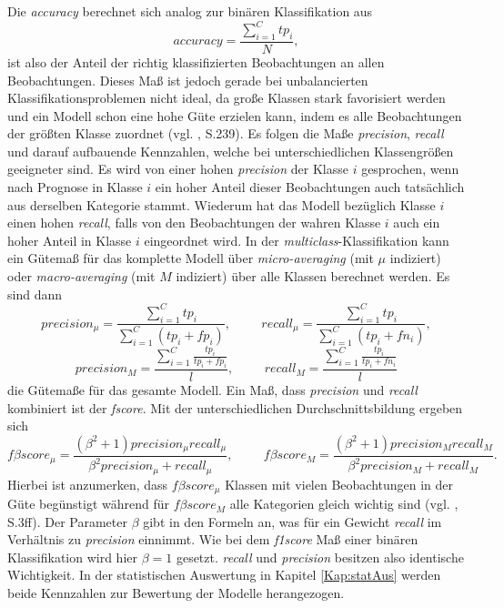 \documentclass[a4paper,11pt]{article}
\begin{document}
Die \textit{accuracy} berechnet sich analog zur binären Klassifikation aus 
\[ accuracy = \frac{\sum_{i=1}^C tp_i}{N},  \]
ist also der Anteil der richtig klassifizierten Beobachtungen an allen Beobachtungen. Dieses Maß ist jedoch gerade bei unbalancierten Klassifikationsproblemen nicht ideal, da große Klassen stark favorisiert werden und ein Modell schon eine hohe Güte erzielen kann, indem es alle Beobachtungen der größten Klasse zuordnet (vgl. \cite{backhaus}, S.239). Es folgen die Maße \textit{precision}, \textit{recall} und darauf aufbauende Kennzahlen, welche bei unterschiedlichen Klassengrößen geeigneter sind. Es wird von einer hohen \textit{precision} der Klasse $i$ gesprochen, wenn nach Prognose in Klasse $i$ ein hoher Anteil dieser Beobachtungen auch tatsächlich aus derselben Kategorie stammt. Wiederum hat das Modell bezüglich Klasse $i$ einen hohen \textit{recall}, falls von den Beobachtungen der wahren Klasse $i$ auch ein hoher Anteil in Klasse $i$ eingeordnet wird.
In der \textit{multiclass}-Klassifikation kann ein Gütemaß für das komplette Modell über \textit{micro-averaging} (mit $\mu$ indiziert) oder \textit{macro-averaging} (mit $M$ indiziert) über alle Klassen berechnet werden. Es sind dann 
\[ precision_{\mu} = \frac{\sum_{i = 1}^C tp_i}{\sum_{i = 1}^C (tp_i + fp_i)}, \hspace{1cm} recall_{\mu} = \frac{\sum_{i = 1}^C tp_i}{\sum_{i = 1}^C (tp_i + fn_i)},\]
\[ precision_M = \frac{\sum_{i = 1}^C \frac{tp_i}{tp_i + fp_i} }{l}, \hspace{1cm} recall_M = \frac{\sum_{i = 1}^C \frac{tp_i}{tp_i + fn_i} }{l}\]
die Gütemaße für das gesamte Modell. Ein Maß, dass \textit{precision} und \textit{recall} kombiniert ist der \textit{fscore}. Mit der unterschiedlichen Durchschnittsbildung ergeben sich
\[ f\beta score_{\mu} = \frac{(\beta^2+1) precision_{\mu} recall_{\mu}}{\beta^2 precision_{\mu}+ recall_{\mu}}, \hspace{1cm} f\beta score_{M} = \frac{(\beta^2+1) precision_{M} recall_{M}}{\beta^2 precision_{M}+ recall_{M}} . \]
Hierbei ist anzumerken, dass $f\beta score_{\mu}$ Klassen mit vielen Beobachtungen in der Güte begünstigt während für $f\beta score_M$ alle Kategorien gleich wichtig sind  (vgl. \cite{sokolova}, S.3ff). Der Parameter $\beta$ gibt in den Formeln an, was für ein Gewicht \textit{recall} im Verhältnis zu \textit{precision} einnimmt.
Wie bei dem \textit{f1score} Maß einer binären Klassifikation wird hier $\beta = 1$ gesetzt. \textit{recall} und \textit{precision} besitzen also identische Wichtigkeit. In der statistischen Auswertung in Kapitel \ref{Kap:statAus} werden beide Kennzahlen zur Bewertung der Modelle herangezogen.\\
\end{document}
